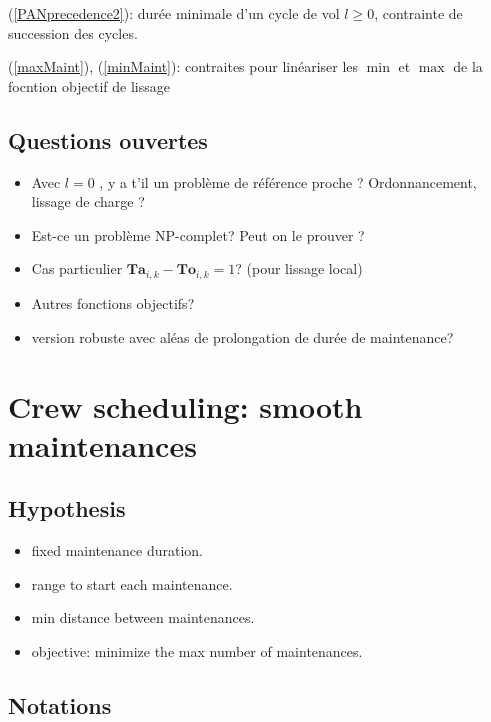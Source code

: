 \documentclass[a4paper,11pt]{article}
\begin{document}
    (\ref{PANprecedence2}): durée minimale d'un cycle de vol $l\geqslant 0$, contrainte de succession des cycles.

    (\ref{maxMaint}), (\ref{minMaint}): contraites pour linéariser les $\min$ et $\max$ de la focntion objectif de lissage

    \subsection{Questions ouvertes}

    \begin{itemize}
    \item Avec $l=0$ , y a t'il un problème de référence proche ? Ordonnancement, lissage de charge ?
    \item Est-ce un problème NP-complet? Peut on le prouver ?
     \item Cas particulier $\mathbf{Ta}_{i,k}-\mathbf{To}_{i,k}=1$? (pour lissage local)
     \item Autres fonctions objectifs?
     \item version robuste avec aléas de prolongation de durée de maintenance?
    \end{itemize}

\clearpage

\section{Crew scheduling: smooth maintenances}


    \subsection{Hypothesis}

    \begin{itemize}
     \item fixed maintenance duration.
     \item range to start each maintenance.
     \item min distance between maintenances.
     \item objective: minimize the max number of maintenances.
    \end{itemize}

    \subsection{Notations}
\end{document}
